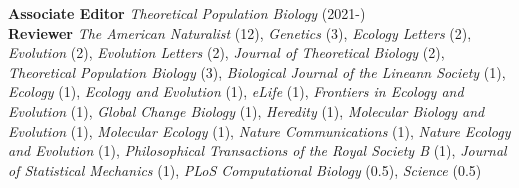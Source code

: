 \documentclass[12pt]{article}
\begin{document}
\noindent \textbf{Associate Editor} \textit{Theoretical Population Biology} (2021-)\\
\noindent \textbf{Reviewer} \textit{The American Naturalist} (12), \textit{Genetics} (3), \textit{Ecology Letters} (2), \textit{Evolution} (2), \textit{Evolution Letters} (2), \textit{Journal of Theoretical Biology} (2), \textit{Theoretical Population Biology} (3), \textit{Biological Journal of the Lineann Society} (1), \textit{Ecology} (1), \textit{Ecology and Evolution} (1), \textit{eLife} (1), \textit{Frontiers in Ecology and Evolution} (1), \textit{Global Change Biology} (1), \textit{Heredity} (1), \textit{Molecular Biology and Evolution} (1), \textit{Molecular Ecology} (1), \textit{Nature Communications} (1), \textit{Nature Ecology and Evolution} (1), \textit{Philosophical Transactions of the Royal Society B} (1), \textit{Journal of Statistical Mechanics} (1), \textit{PLoS Computational Biology} (0.5), \textit{Science} (0.5)


%
\end{document}
